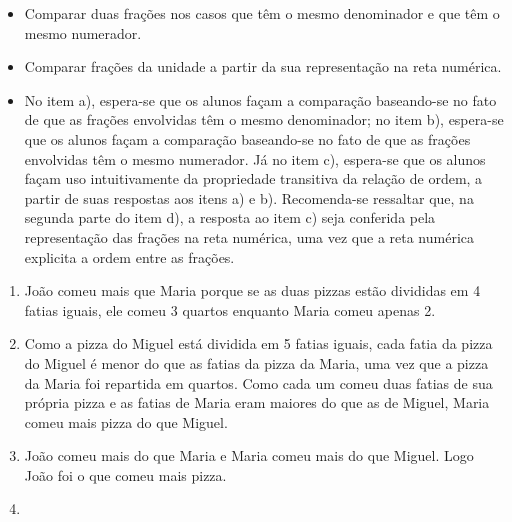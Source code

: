 \clearpage
\begin{atividade}\label{chap3-ativ8}
\objetivos
\begin{itemize} %
    \item Comparar  duas frações nos casos  que têm o mesmo denominador e que têm o mesmo numerador.
    \item Comparar frações da unidade a partir da sua representação na reta numérica.
\end{itemize} %

\discussoes
\begin{itemize} %
    \item       No item a), espera-se que os alunos façam a comparação baseando-se no fato de que as frações envolvidas têm o mesmo denominador; no item b), espera-se que os alunos façam a comparação baseando-se no fato de que as frações envolvidas têm o mesmo numerador. Já no item c), espera-se que os alunos façam uso intuitivamente da propriedade transitiva da relação de ordem, a partir de suas respostas aos itens a) e b). Recomenda-se ressaltar que, na segunda parte do item d), a resposta ao item c) seja conferida pela representação das frações na reta numérica, uma vez que a reta numérica explicita a ordem entre as frações.
\end{itemize} %

\solucao
\begin{enumerate}
\item       João comeu mais que Maria porque se as duas pizzas estão divididas em 4 fatias iguais, ele comeu 3 quartos enquanto Maria comeu apenas 2.
\item Como a pizza do Miguel está dividida em 5 fatias iguais, cada fatia da pizza do Miguel é menor do que as fatias da pizza da Maria, uma vez que a pizza da Maria foi repartida em quartos. Como cada um comeu duas fatias de sua própria pizza e as fatias de Maria eram maiores do que as de Miguel, Maria comeu mais pizza do que Miguel.
\item João comeu mais do que Maria e Maria comeu mais do que Miguel. Logo João foi o que comeu mais pizza. 

\item {}
{
}
\end{enumerate}

\end{atividade}

